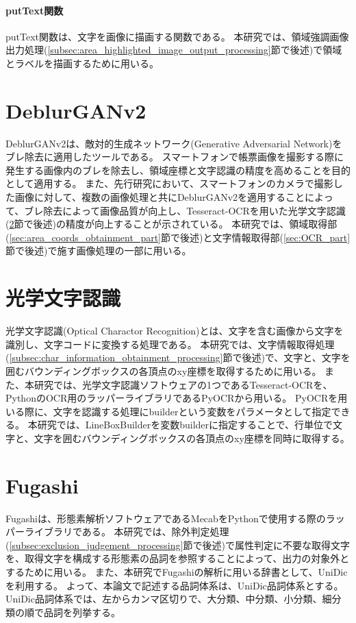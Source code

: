 \paragraph{putText関数}
putText関数は、文字を画像に描画する関数である。
本研究では、領域強調画像出力処理(\ref{subsec:area_highlighted_image_output_processing}節で後述)で領域とラベルを描画するために用いる。

\section{DeblurGANv2}\label{sec:DeblurGANv2}
DeblurGANv2は、敵対的生成ネットワーク(Generative Adversarial Network)をブレ除去に適用したツールである\cite{DeblurGANv2}。
スマートフォンで帳票画像を撮影する際に発生する画像内のブレを除去し、領域座標と文字認識の精度を高めることを目的として適用する。
また、先行研究において、スマートフォンのカメラで撮影した画像に対して、複数の画像処理と共にDeblurGANv2を適用することによって、ブレ除去によって画像品質が向上し、Tesseract-OCR\cite{Tesseract-OCR}を用いた光学文字認識(\ref{sec:Optical-Charactor-Recognition}節で後述)の精度が向上することが示されている\cite{DeblurGANv2の先行研究}。
本研究では、領域取得部(\ref{sec:area_coords_obtainment_part}節で後述)と文字情報取得部(\ref{sec:OCR_part}節で後述)で施す画像処理の一部に用いる。


\section{光学文字認識}\label{sec:Optical-Charactor-Recognition}
光学文字認識(Optical Charactor Recognition)とは、文字を含む画像から文字を識別し、文字コードに変換する処理である\cite{光学文字認識}。
本研究では、文字情報取得処理(\ref{subsec:char_information_obtainment_processing}節で後述)で、文字と、文字を囲むバウンディングボックスの各頂点のxy座標を取得するために用いる。
また、本研究では、光学文字認識ソフトウェア\cite{光学文字認識ソフトウェア}の1つであるTesseract-OCRを、Python\cite{Python}のOCR用のラッパーライブラリであるPyOCR\cite{PyOCR}から用いる。
PyOCRを用いる際に、文字を認識する処理にbuilderという変数をパラメータとして指定できる。
本研究では、LineBoxBuilderを変数builderに指定することで、行単位で文字と、文字を囲むバウンディングボックスの各頂点のxy座標を同時に取得する。

\section{Fugashi}\label{sec:Fugashi}
Fugashiは、形態素解析ソフトウェアであるMecab\cite{Mecab}をPythonで使用する際のラッパーライブラリである\cite{Fugashi}。
本研究では、除外判定処理(\ref{subsec:exclusion_judgement_processing}節で後述)で属性判定に不要な取得文字を、取得文字を構成する形態素の品詞を参照することによって、出力の対象外とするために用いる。
また、本研究でFugashiの解析に用いる辞書として、UniDic\cite{UniDic}を利用する。
よって、本論文で記述する品詞体系は、UniDic品詞体系とする。
UniDic品詞体系では、左からカンマ区切りで、大分類、中分類、小分類、細分類の順で品詞を列挙する\cite{UniDic品詞体系}。

